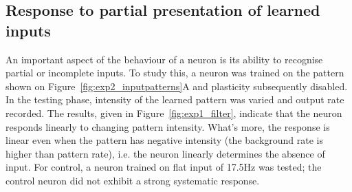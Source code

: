 \documentclass[a4paper,12pt]{report}
\theoremstyle{definition}
\begin{document}
\begin{figure}[!htb]
\begin{minipage}[t]{.5\textwidth}
  \captionsetup{width=0.95\linewidth}
  \label{fig:exp5_patterncompletion}
\end{minipage}
\end{figure}







\subsection{Response to partial presentation of learned inputs}
\label{subsec:partialpatterns}


An important aspect of the behaviour of a neuron is its ability to recognise partial or incomplete inputs. To study this, a neuron was trained on the pattern shown on Figure~\ref{fig:exp2_inputpatterns}A and plasticity subsequently disabled. In the testing phase, intensity of the learned pattern was varied and output rate recorded. The results, given in Figure~\ref{fig:exp1_filter}, indicate that the neuron responds linearly to changing pattern intensity. What's more, the response is linear even when the pattern has negative intensity (the background rate is higher than pattern rate), i.e. the neuron linearly determines the absence of input. For control, a neuron trained on flat input of 17.5Hz was tested; the control neuron did not exhibit a strong systematic response.


\end{document}
